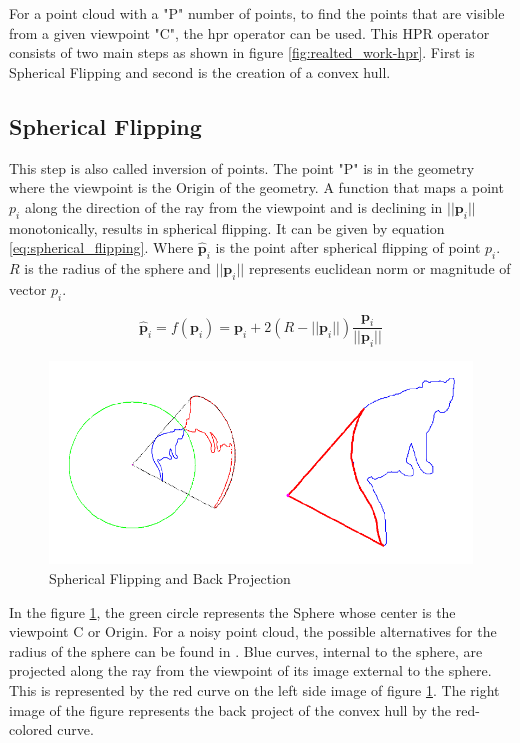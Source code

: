 For a point cloud with a "P" number of points, to find the points that are visible from a given viewpoint "C", the \acrshort{hpr} operator can be used. This HPR operator consists of two main steps as shown in figure \ref{fig:realted_work-hpr}. First is Spherical Flipping and second is the creation of a convex hull. 

\subsection{Spherical Flipping}
This step is also called inversion of points. The point "P" is in the geometry where the viewpoint is the Origin of the geometry. A function that maps a point \(p_i\) along the direction of the ray from the viewpoint and is declining in \(||\mathbf{p}_i||\) monotonically, results in spherical flipping. It can be given by equation \ref{eq:spherical_flipping}. Where \(\hat{\mathbf{p}}_i \) is the point after spherical flipping of point \(p_i\). \(R\) is the radius of the sphere and \(||\mathbf{p}_i||\) represents euclidean norm or magnitude of vector \(p_i\).

\begin{equation}\label{eq:spherical_flipping}
\hat{\mathbf{p}}_i = f(\mathbf{p}_i) = \mathbf{p}_i + 2(R - ||\mathbf{p}_i||) \frac{\mathbf{p}_i}{||\mathbf{p}_i||}
\end{equation}


\begin{figure}[htbp]
    \centering
    \includegraphics[width=0.5\linewidth]{97_graphics/related_work/spherical_flipping.pdf}
    \caption{Spherical Flipping and Back Projection\parencite{katz2007}}
    \label{fig:related_work-spherical_flipping}
\end{figure}

In the figure \ref{fig:related_work-spherical_flipping}, the green circle represents the Sphere whose center is the viewpoint C or Origin. For a noisy point cloud, the possible alternatives for the radius of the sphere can be found in \parencite{mehra_visibility_XXXX}. Blue curves, internal to the sphere, are projected along the ray from the viewpoint of its image external to the sphere.  This is represented by the red curve on the left side image of figure \ref{fig:related_work-spherical_flipping}. The right image of the figure represents the back project of the convex hull by the red-colored curve.

